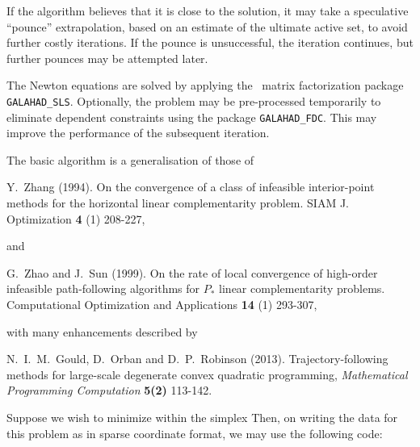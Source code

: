 \documentclass{galahad}
\begin{document}
If the algorithm believes that it is close to the solution, it may take a
speculative ``pounce'' extrapolation, based on an estimate of the ultimate 
active set, to avoid further costly iterations. If the pounce is unsuccessful, 
the iteration continues, but further pounces may be attempted later.

The Newton equations are solved  by applying the
\galahad\ matrix factorization package
{\tt GALAHAD\_SLS}.
Optionally, the problem may be pre-processed temporarily to eliminate dependent
constraints using the package {\tt GALAHAD\_FDC}. This may improve the
performance of the subsequent iteration.

\vspace*{1mm}

\galreferences
\vspace*{1mm}

\noindent
The basic algorithm is a generalisation of those of
\vspace*{1mm}

\noindent
Y.\ Zhang (1994).
On the convergence of a class of infeasible interior-point methods for the
horizontal linear complementarity problem.
SIAM J. Optimization {\bf 4} (1) 208-227,
\vspace*{1mm}

\noindent
and

\noindent
G.\ Zhao and J.\ Sun (1999).
On the rate of local convergence of high-order
infeasible path-following algorithms for $P_*$ linear complementarity
problems.
Computational Optimization and Applications {\bf 14} (1) 293-307,
\vspace*{1mm}

\noindent
with many enhancements described by
\vspace*{1mm}

\noindent
N.\ I.\ M.\ Gould, D.\ Orban and D.\ P.\ Robinson (2013).
Trajectory-following methods for
large-scale  degenerate convex quadratic programming,
{\em Mathematical Programming Computation} {\bf 5(2)} 113-142.


\galexample
Suppose we wish to minimize
within the simplex
Then, on writing the data for this problem as
in sparse coordinate format, we may use the following code:
\end{document}

